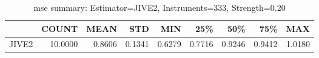 \begin{table}[ht]
\centering
\caption{mse summary: Estimator=JIVE2, Instruments=333, Strength=0.20}
\begin{tabular}{lrrrrrrrr}
\toprule
 & COUNT & MEAN & STD & MIN & 25\% & 50\% & 75\% & MAX \\
\midrule
JIVE2 & 10.0000 & 0.8606 & 0.1341 & 0.6279 & 0.7716 & 0.9246 & 0.9412 & 1.0180 \\
\bottomrule
\end{tabular}
\end{table}
